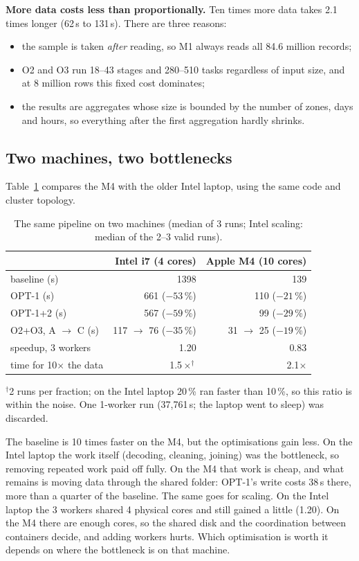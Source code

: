 \documentclass[sigconf]{acmart}
\begin{document}
\textbf{More data costs less than proportionally.} Ten times more data takes 2.1 times longer (62\,s to 131\,s).
There are three reasons:
\begin{itemize}
  \item the sample is taken \emph{after} reading, so M1 always reads all 84.6 million records;
  \item O2 and O3 run 18--43 stages and 280--510 tasks regardless of input size, and at 8 million rows this
    fixed cost dominates;
  \item the results are aggregates whose size is bounded by the number of zones, days and hours, so everything after
    the first aggregation hardly shrinks.
\end{itemize}

\subsection{Two machines, two bottlenecks}
\label{sec:two}

Table~\ref{tab:two} compares the M4 with the older Intel laptop, using the same code and cluster topology.

\begin{table}[h]
\caption{The same pipeline on two machines (median of 3 runs; Intel scaling: median of the 2--3 valid runs).}
\label{tab:two}
\begin{tabular}{lrr}
\toprule
 & Intel i7 (4 cores) & Apple M4 (10 cores) \\
\midrule
baseline (s) & 1398 & 139 \\
OPT-1 (s) & 661 ($-53$\,\%) & 110 ($-21$\,\%) \\
OPT-1+2 (s) & 567 ($-59$\,\%) & 99 ($-29$\,\%) \\
O2+O3, A $\to$ C (s) & 117 $\to$ 76 ($-35$\,\%) & 31 $\to$ 25 ($-19$\,\%) \\
speedup, 3 workers & 1.20 & 0.83 \\
time for 10$\times$ the data & 1.5$\times^{\dagger}$ & 2.1$\times$ \\
\bottomrule
\end{tabular}
{\footnotesize $^{\dagger}$2 runs per fraction; on the Intel laptop 20\,\% ran faster than 10\,\%, so this ratio is
within the noise. One 1-worker run (37,761\,s; the laptop went to sleep) was discarded.}
\end{table}

The baseline is 10 times faster on the M4, but the optimisations gain less. On the Intel laptop the work itself
(decoding, cleaning, joining) was the bottleneck, so removing repeated work paid off fully. On the M4 that work is
cheap, and what remains is moving data through the shared folder: OPT-1's write costs 38\,s there, more than a quarter of
the baseline. The same goes for scaling. On the Intel laptop the 3 workers shared 4 physical cores and still gained a
little (1.20). On the M4 there are enough cores, so the shared disk and the coordination between containers decide,
and adding workers hurts. Which optimisation is worth it depends on where the bottleneck is on that machine.
\end{document}

